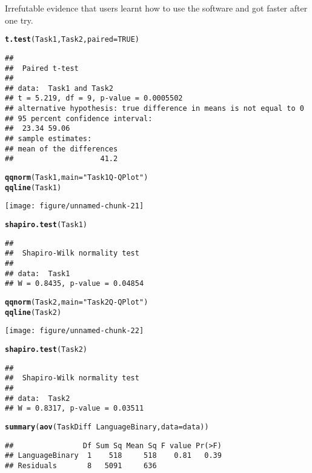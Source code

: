 \documentclass[12pt, twoside, a4paper, openright]{report}\usepackage[]{graphicx}\usepackage[]{color}
\makeatletter
\def\maxwidth{ %
  \ifdim\Gin@nat@width>\linewidth
    \linewidth
  \else
    \Gin@nat@width
  \fi
}
\newcommand{\hlnum}[1]{\textcolor[rgb]{0.686,0.059,0.569}{#1}}%
\newcommand{\hlstr}[1]{\textcolor[rgb]{0.192,0.494,0.8}{#1}}%
\newcommand{\hlopt}[1]{\textcolor[rgb]{0,0,0}{#1}}%
\newcommand{\hlstd}[1]{\textcolor[rgb]{0.345,0.345,0.345}{#1}}%
\newcommand{\hlkwc}[1]{\textcolor[rgb]{0.333,0.667,0.333}{#1}}%
\newcommand{\hlkwd}[1]{\textcolor[rgb]{0.737,0.353,0.396}{\textbf{#1}}}%
\newenvironment{kframe}{%
 \def\at@end@of@kframe{}%
 \ifinner\ifhmode%
  \def\at@end@of@kframe{\end{minipage}}%
  \begin{minipage}{\columnwidth}%
 \fi\fi%
 \def\FrameCommand##1{\hskip\@totalleftmargin \hskip-\fboxsep
 \colorbox{shadecolor}{##1}\hskip-\fboxsep
     \hskip-\linewidth \hskip-\@totalleftmargin \hskip\columnwidth}%
 \MakeFramed {\advance\hsize-\width
   \@totalleftmargin\z@ \linewidth\hsize
   \@setminipage}}%
 {\par\unskip\endMakeFramed%
 \at@end@of@kframe}
\newenvironment{knitrout}{}{} %
\makeatother
\begin{document}
Irrefutable evidence that users learnt how to use the software and got faster after one try.
\begin{knitrout}
\color{fgcolor}\begin{kframe}
\begin{alltt}
\hlkwd{t.test}\hlstd{(Task1, Task2,} \hlkwc{paired} \hlstd{=} \hlnum{TRUE}\hlstd{)}
\end{alltt}
\begin{verbatim}
## 
## 	Paired t-test
## 
## data:  Task1 and Task2
## t = 5.219, df = 9, p-value = 0.0005502
## alternative hypothesis: true difference in means is not equal to 0
## 95 percent confidence interval:
##  23.34 59.06
## sample estimates:
## mean of the differences 
##                    41.2
\end{verbatim}
\begin{alltt}
\hlkwd{qqnorm}\hlstd{(Task1,} \hlkwc{main} \hlstd{=} \hlstr{"Task 1 Q-Q Plot"}\hlstd{)}
\hlkwd{qqline}\hlstd{(Task1)}
\end{alltt}
\end{kframe}
\texttt{[image: figure/unnamed-chunk-21]} 
\begin{kframe}\begin{alltt}
\hlkwd{shapiro.test}\hlstd{(Task1)}
\end{alltt}
\begin{verbatim}
## 
## 	Shapiro-Wilk normality test
## 
## data:  Task1
## W = 0.8435, p-value = 0.04854
\end{verbatim}
\begin{alltt}
\hlkwd{qqnorm}\hlstd{(Task2,} \hlkwc{main} \hlstd{=} \hlstr{"Task 2 Q-Q Plot"}\hlstd{)}
\hlkwd{qqline}\hlstd{(Task2)}
\end{alltt}
\end{kframe}
\texttt{[image: figure/unnamed-chunk-22]} 
\begin{kframe}\begin{alltt}
\hlkwd{shapiro.test}\hlstd{(Task2)}
\end{alltt}
\begin{verbatim}
## 
## 	Shapiro-Wilk normality test
## 
## data:  Task2
## W = 0.8317, p-value = 0.03511
\end{verbatim}
\begin{alltt}
\hlkwd{summary}\hlstd{(}\hlkwd{aov}\hlstd{(TaskDiff} \hlopt{~} \hlstd{LanguageBinary,} \hlkwc{data} \hlstd{= data))}
\end{alltt}
\begin{verbatim}
##                Df Sum Sq Mean Sq F value Pr(>F)
## LanguageBinary  1    518     518    0.81   0.39
## Residuals       8   5091     636
\end{verbatim}
\end{kframe}
\end{knitrout}
\end{document}
